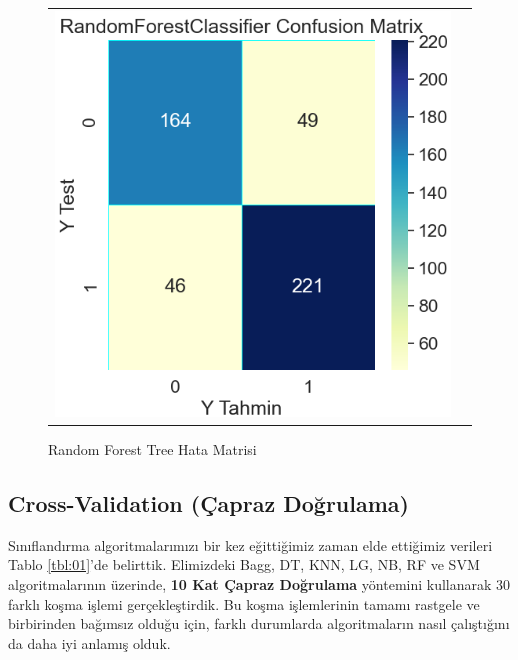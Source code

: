 \documentclass[conference]{IEEEtran}
\begin{document}
\begin{figure}[!h]
	\centering
	\begin{center}
		\begin{tabular}{cc}
			\includegraphics[scale=0.4]{pictures/pic_15.png}&
		\end{tabular}
	\end{center}
	\caption{Random Forest Tree Hata Matrisi}
	\label{fig:15}
\end{figure}
\pagebreak



\newpage
\subsection{\textbf{Cross-Validation (Çapraz Doğrulama)}}
\quad Sınıflandırma algoritmalarımızı bir kez eğittiğimiz zaman elde ettiğimiz verileri Tablo \ref{tbl:01}'de belirttik. Elimizdeki  Bagg, DT, KNN, LG, NB, RF ve SVM algoritmalarının üzerinde, \textbf{10 Kat Çapraz Doğrulama} yöntemini kullanarak 30 farklı koşma işlemi gerçekleştirdik. Bu koşma işlemlerinin tamamı rastgele ve birbirinden bağımsız olduğu için, farklı durumlarda algoritmaların nasıl çalıştığını da daha iyi anlamış olduk.
\end{document}
